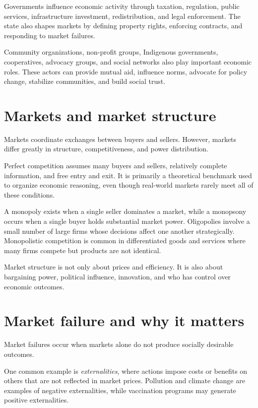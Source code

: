 \documentclass[
  11pt,
  oneside]{book}
\begin{document}
Governments influence economic activity through taxation, regulation, public services, infrastructure investment, redistribution, and legal enforcement. The state also shapes markets by defining property rights, enforcing contracts, and responding to market failures.

Community organizations, non-profit groups, Indigenous governments, cooperatives, advocacy groups, and social networks also play important economic roles. These actors can provide mutual aid, influence norms, advocate for policy change, stabilize communities, and build social trust.

\section{Markets and market structure}\label{markets-and-market-structure}

Markets coordinate exchanges between buyers and sellers. However, markets differ greatly in structure, competitiveness, and power distribution.

Perfect competition assumes many buyers and sellers, relatively complete information, and free entry and exit. It is primarily a theoretical benchmark used to organize economic reasoning, even though real-world markets rarely meet all of these conditions.

A monopoly exists when a single seller dominates a market, while a monopsony occurs when a single buyer holds substantial market power. Oligopolies involve a small number of large firms whose decisions affect one another strategically. Monopolistic competition is common in differentiated goods and services where many firms compete but products are not identical.

Market structure is not only about prices and efficiency. It is also about bargaining power, political influence, innovation, and who has control over economic outcomes.

\section{Market failure and why it matters}\label{market-failure-and-why-it-matters}

Market failures occur when markets alone do not produce socially desirable outcomes.

One common example is \emph{externalities}, where actions impose costs or benefits on others that are not reflected in market prices. Pollution and climate change are examples of negative externalities, while vaccination programs may generate positive externalities.
\end{document}
